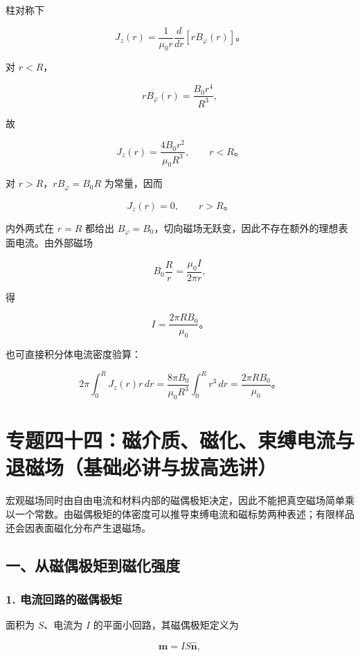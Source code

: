 柱对称下

\[
J_z(r)=\frac1{\mu_0r}\frac{d}{dr}\left[rB_{\varphi}(r)\right]\text{。}
\]

对 \(r<R\)，

\[
rB_{\varphi}(r)=\frac{B_0r^4}{R^3},
\]

故

\[
\boxed{J_z(r)=\frac{4B_0r^2}{\mu_0R^3}},
\qquad r<R\text{。}
\]

对 \(r>R\)，\(rB_{\varphi}=B_0R\) 为常量，因而

\[
\boxed{J_z(r)=0},
\qquad r>R\text{。}
\]

内外两式在 \(r=R\) 都给出
\(B_{\varphi}=B_0\)，切向磁场无跃变，因此不存在额外的理想表面电流。由外部磁场

\[
B_0\frac Rr=\frac{\mu_0I}{2\pi r},
\]

得

\[
\boxed{I=\frac{2\pi RB_0}{\mu_0}}\text{。}
\]

也可直接积分体电流密度验算：

\[
2\pi\int_0^R J_z(r)r\,dr
=\frac{8\pi B_0}{\mu_0R^3}\int_0^Rr^3\,dr
=\frac{2\pi RB_0}{\mu_0}\text{。}
\]

\section{专题四十四：磁介质、磁化、束缚电流与退磁场（基础必讲与拔高选讲）}\label{m5:ux4e13ux9898ux56dbux5341ux56dbux78c1ux4ecbux8d28ux78c1ux5316ux675fux7f1aux7535ux6d41ux4e0eux9000ux78c1ux573aux57faux7840ux5fc5ux8bb2ux4e0eux62d4ux9ad8ux9009ux8bb2}

宏观磁场同时由自由电流和材料内部的磁偶极矩决定，因此不能把真空磁场简单乘以一个常数。由磁偶极矩的体密度可以推导束缚电流和磁标势两种表述；有限样品还会因表面磁化分布产生退磁场。

\subsection{一、从磁偶极矩到磁化强度}\label{m5:ux4e00ux4eceux78c1ux5076ux6781ux77e9ux5230ux78c1ux5316ux5f3aux5ea6}

\subsubsection{1.
电流回路的磁偶极矩}\label{m5:ux7535ux6d41ux56deux8defux7684ux78c1ux5076ux6781ux77e9}

面积为 \(S\)、电流为 \(I\) 的平面小回路，其磁偶极矩定义为

\[
\boxed{\mathbf m=IS\hat{\mathbf n}},
\]

